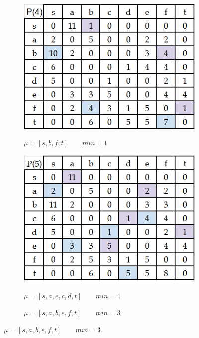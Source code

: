 \documentclass{article}
\begin{document}
\begin{enumerate}
\begin{figure}
\begin{subfigure}[b]{0.3\textwidth}
         \centering
         \caption*{\small{$\mu = [s, b, f, t]\qquad min = 1$}}
         \includegraphics[width=\textwidth]{attachments/16/4.png}
         \label{fig:16_4}
     \end{subfigure}
     \hfill
     \begin{subfigure}[b]{0.3\textwidth}
         \centering
         \caption*{\small{$\mu = [s, a, e, c, d, t] \qquad min = 1$}}
         \includegraphics[width=\textwidth]{attachments/16/5.png}
         \label{fig:16_5}
     \end{subfigure}
     \hfill
     \begin{subfigure}[b]{0.3\textwidth}
         \centering
         \caption*{\small{$\mu = [s, a, b, e, f, t]\qquad min = 3$}}

\end{subfigure}
\end{figure}
\end{enumerate}
\end{document}
